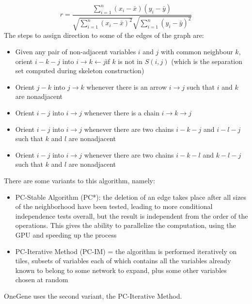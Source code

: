 \documentclass[journal]{IEEEtran}
\begin{document}
\begin{equation*}
  r = \frac{\sum_{i=1}^{n}(x_i-\bar{x})(y_i-\bar{y})}{\sqrt{\sum_{i=1}^{n}(x_i-\bar{x})^2}\sqrt{\sum_{i=1}^{n}(y_i-\bar{y})^2}}
\end{equation*}
The steps to assign direction to some of the edges of the graph are:
\begin{itemize}
    \item Given any pair of non-adjacent variables $i$ and $j$ with common neighbour $k$, orient $i - k - j$ into $i \rightarrow k \leftarrow j $if $k$ is not in $S(i, j)$ (which is the separation set computed during skeleton construction)
    \item Orient $j - k$ into $j \rightarrow k$ whenever there is an arrow $i \rightarrow j$ such that $i$ and $k$ are nonadjacent
    \item Orient $i - j$ into $i \rightarrow j$ whenever there is a chain $i \rightarrow k \rightarrow j$
    \item Orient $i - j$ into $i \rightarrow j$ whenever there are two chains $i - k - j$ and $i - l - j$ such that $k$ and $l$ are nonadjacent
    \item Orient $i - j$ into $i \rightarrow j$ whenever there are two chains $i - k - l$ and $k - l - j$ such that $k$ and $l$ are nonadjacent
\end{itemize}
There are some variants to this algorithm, namely:
\begin{itemize}
    \item PC-Stable Algorithm (PC*): the deletion of an edge takes place after all sizes of the neighborhood have been tested, leading to more conditional independence tests overall, but the result is independent from the order of the operations. This gives the ability to parallelize the computation, using the GPU and speeding up the process
    \item PC-Iterative Method (PC-IM) = the algorithm is performed iteratively on tiles, subsets of variables each of which contains all the variables already known to belong to some network to expand, plus some other variables chosen at random
\end{itemize}
OneGene uses the second variant, the PC-Iterative Method.
\end{document}
